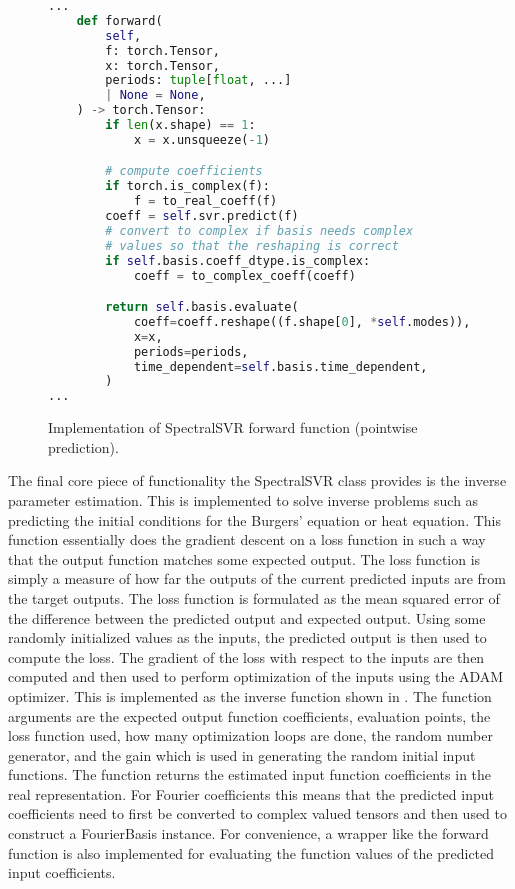 \begin{figure}[H]
  \centering
  \begin{lstlisting}[language=Python]
...
    def forward(
        self,
        f: torch.Tensor,
        x: torch.Tensor,
        periods: tuple[float, ...]
        | None = None,
    ) -> torch.Tensor:
        if len(x.shape) == 1:
            x = x.unsqueeze(-1)

        # compute coefficients
        if torch.is_complex(f):
            f = to_real_coeff(f)
        coeff = self.svr.predict(f)
        # convert to complex if basis needs complex
        # values so that the reshaping is correct
        if self.basis.coeff_dtype.is_complex:
            coeff = to_complex_coeff(coeff)

        return self.basis.evaluate(
            coeff=coeff.reshape((f.shape[0], *self.modes)),
            x=x,
            periods=periods,
            time_dependent=self.basis.time_dependent,
        )
...
  \end{lstlisting}
  \caption{Implementation of SpectralSVR forward function (pointwise prediction).}\label{fig:spectralsvr_forward_impl}
\end{figure}

The final core piece of functionality the SpectralSVR class provides is the inverse parameter estimation. This is implemented to solve inverse problems such as predicting the initial conditions for the Burgers' equation or heat equation. This function essentially does the gradient descent on a loss function in such a way that the output function matches some expected output. The loss function is simply a measure of how far the outputs of the current predicted inputs are from the target outputs. The loss function is formulated as the mean squared error of the difference between the predicted output and expected output. Using some randomly initialized values as the inputs, the predicted output is then used to compute the loss. The gradient of the loss with respect to the inputs are then computed and then used to perform optimization of the inputs using the ADAM optimizer. This is implemented as the inverse function shown in . The function arguments are the expected output function coefficients, evaluation points, the loss function used, how many optimization loops are done, the random number generator, and the gain which is used in generating the random initial input functions. The function returns the estimated input function coefficients in the real representation. For Fourier coefficients this means that the predicted input coefficients need to first be converted to complex valued tensors and then used to construct a FourierBasis instance. For convenience, a wrapper like the forward function is also implemented for evaluating the function values of the predicted input coefficients.

